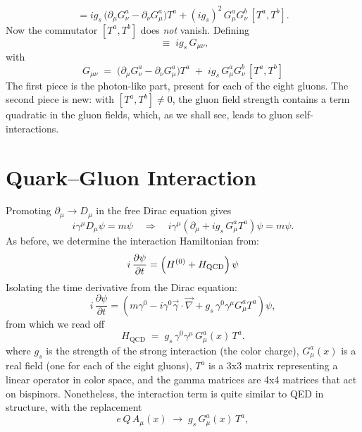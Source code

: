 \documentclass[12pt]{article}
\begin{document}
\begin{equation*}
    [D_\mu, D_\nu] = i g_s\,\big(\partial_\mu G^a_\nu - \partial_\nu G^a_\mu\big) T^a
       + (i g_s)^2\, G^a_\mu G^b_\nu\, [T^a, T^b].
\end{equation*}
Now the commutator $[T^a, T^b]$ does \emph{not} vanish.  Defining
\begin{equation*}
    [D_\mu, D_\nu] \;\equiv\; i g_s\, G_{\mu\nu},
\end{equation*}
with
\begin{equation}
 \label{eqn:field-qcd}
G_{\mu\nu} \;=\; \big(\partial_\mu G^a_\nu - \partial_\nu G^a_\mu\big) T^a
                          \;+\; i g_s\, G^a_\mu G^b_\nu\, [T^a, T^b]
\end{equation}
The first piece is the photon-like part, present for each of the eight
gluons.  The second piece is new: with $[T^a, T^b] \neq 0$, the gluon
field strength contains a term quadratic in the gluon fields, which,
as we shall see, leads to gluon self-interactions.

\section{Quark--Gluon Interaction}

Promoting $\partial_\mu \to D_\mu$ in the free Dirac equation gives
\begin{equation*}
    i\gamma^\mu D_\mu \psi = m\psi
    \quad\Longrightarrow\quad
    i\gamma^\mu\!\left(\partial_\mu + i g_s\, G^a_\mu T^a\right)\psi = m\psi.
\end{equation*}
As before, we determine the interaction Hamiltonian from:
$$
i\,\frac{\partial \psi}{\partial t}
= \left( H^{(0)} + H_{\rm QCD} \right) \psi
$$
Isolating the time derivative from the Dirac equation:
\begin{equation*}
    i\,\frac{\partial \psi}{\partial t}
       = \left( m\gamma^0 - i\gamma^0\vec\gamma\cdot\vec\nabla
                + g_s\,\gamma^0 \gamma^\mu G^a_\mu T^a \right)\psi,
\end{equation*}
from which we read off
\begin{equation*}
    H_\text{QCD} \;=\; g_s\, \gamma^0 \gamma^\mu\, G^a_\mu(x)\, T^a.
\end{equation*}
where $g_s$ is the strength of the strong interaction (the color
charge), $G^a_\mu(x)$ is a real field (one for each of the eight
gluons), $T^a$ is a 3x3 matrix representing a linear operator in color
space, and the gamma matrices are 4x4 matrices that act on bispinors.
Nonetheless, the interaction term is quite similar to QED in
structure, with the replacement
\begin{equation*}
    e\,Q\, A_\mu(x) \;\longrightarrow\; g_s\, G^a_\mu(x)\, T^a,
\end{equation*}
\end{document}

